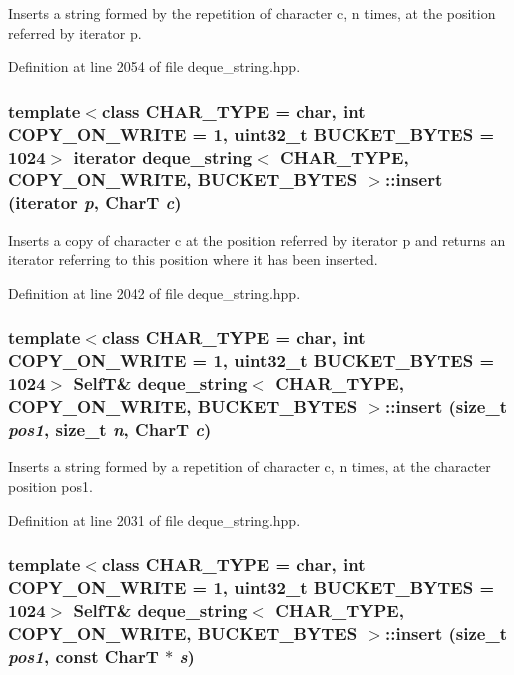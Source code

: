 Inserts a string formed by the repetition of character c, n times, at the position referred by iterator p. 

Definition at line 2054 of file deque\_\-string.hpp.\hypertarget{classdeque__string_78045a454b744aec347592e03d1c9afc}{
\subsubsection[{insert}]{\setlength{\rightskip}{0pt plus 5cm}template$<$class CHAR\_\-TYPE  = char, int COPY\_\-ON\_\-WRITE = 1, uint32\_\-t BUCKET\_\-BYTES = 1024$>$ iterator {\bf deque\_\-string}$<$ CHAR\_\-TYPE, COPY\_\-ON\_\-WRITE, BUCKET\_\-BYTES $>$::insert (iterator {\em p}, \/  CharT {\em c})}}
\label{classdeque__string_78045a454b744aec347592e03d1c9afc}


Inserts a copy of character c at the position referred by iterator p and returns an iterator referring to this position where it has been inserted. 

Definition at line 2042 of file deque\_\-string.hpp.\hypertarget{classdeque__string_f6733b1f605197c2d81b2c5422726b9c}{
\subsubsection[{insert}]{\setlength{\rightskip}{0pt plus 5cm}template$<$class CHAR\_\-TYPE  = char, int COPY\_\-ON\_\-WRITE = 1, uint32\_\-t BUCKET\_\-BYTES = 1024$>$ {\bf SelfT}\& {\bf deque\_\-string}$<$ CHAR\_\-TYPE, COPY\_\-ON\_\-WRITE, BUCKET\_\-BYTES $>$::insert (size\_\-t {\em pos1}, \/  size\_\-t {\em n}, \/  CharT {\em c})}}
\label{classdeque__string_f6733b1f605197c2d81b2c5422726b9c}


Inserts a string formed by a repetition of character c, n times, at the character position pos1. 

Definition at line 2031 of file deque\_\-string.hpp.\hypertarget{classdeque__string_2b8514eee08029ac4330f119595618b9}{
\subsubsection[{insert}]{\setlength{\rightskip}{0pt plus 5cm}template$<$class CHAR\_\-TYPE  = char, int COPY\_\-ON\_\-WRITE = 1, uint32\_\-t BUCKET\_\-BYTES = 1024$>$ {\bf SelfT}\& {\bf deque\_\-string}$<$ CHAR\_\-TYPE, COPY\_\-ON\_\-WRITE, BUCKET\_\-BYTES $>$::insert (size\_\-t {\em pos1}, \/  const CharT $\ast$ {\em s})}}
\label{classdeque__string_2b8514eee08029ac4330f119595618b9}


